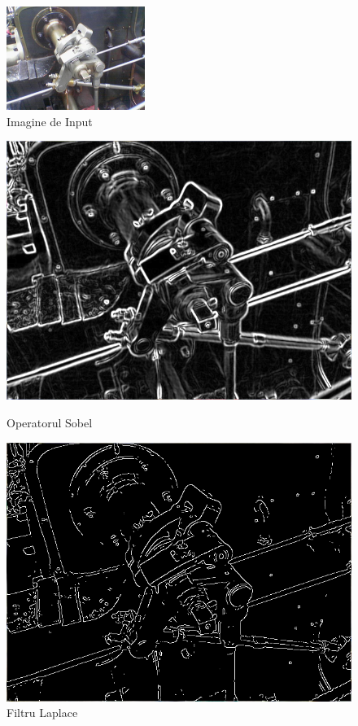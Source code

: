 \documentclass[a4paper,12pt]{report}
\begin{document}
\begin{figure}[h!]
    \centering
    \includegraphics[width=0.4\textwidth]{images/input_edge_detection.jpg}
    \caption{Imagine de Input}
\end{figure}
\FloatBarrier
\begin{figure}[h!]
    \centering
    \begin{minipage}{0.4\textwidth}
        \centering
        \includegraphics[width=1\textwidth]{images/sobel_edge_detection.jpg}
        \caption{Operatorul Sobel}
    \end{minipage}
    \hspace{0.05\textwidth}
    \begin{minipage}{0.4\textwidth}
        \centering
        \includegraphics[width=1\textwidth]{images/canny_edge_detection.jpg}
        \caption{Filtru Laplace}
    \end{minipage}
\end{figure}
\FloatBarrier
\end{document}
